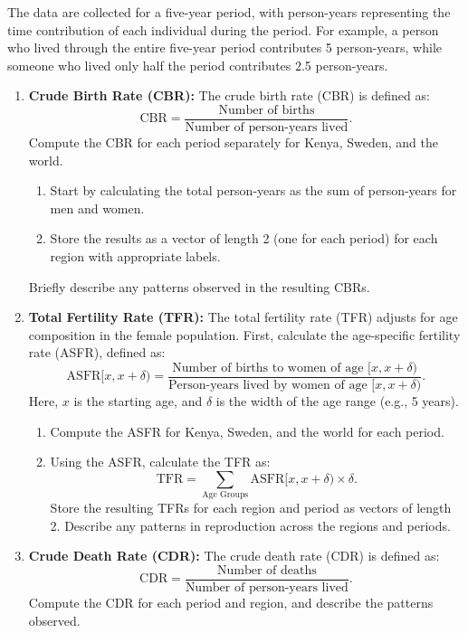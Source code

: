 \documentclass[12pt]{article}
\begin{document}
The data are collected for a five-year period, with person-years representing the time contribution of each individual during the period. For example, a person who lived through the entire five-year period contributes 5 person-years, while someone who lived only half the period contributes 2.5 person-years.

\begin{enumerate}
    \item \textbf{Crude Birth Rate (CBR):} The crude birth rate (CBR) is defined as:
    \[
    \text{CBR} = \frac{\text{Number of births}}{\text{Number of person-years lived}}.
    \]
    Compute the CBR for each period separately for Kenya, Sweden, and the world. 
    \begin{enumerate}
        \item Start by calculating the total person-years as the sum of person-years for men and women.
        \item Store the results as a vector of length 2 (one for each period) for each region with appropriate labels.
    \end{enumerate}
    Briefly describe any patterns observed in the resulting CBRs.

    \item \textbf{Total Fertility Rate (TFR):} The total fertility rate (TFR) adjusts for age composition in the female population. First, calculate the age-specific fertility rate (ASFR), defined as:
    \[
    \text{ASFR}[x, x+\delta) = \frac{\text{Number of births to women of age } [x, x+\delta)}{\text{Person-years lived by women of age } [x, x+\delta)}.
    \]
    Here, $x$ is the starting age, and $\delta$ is the width of the age range (e.g., 5 years). 
    \begin{enumerate}
        \item Compute the ASFR for Kenya, Sweden, and the world for each period.
        \item Using the ASFR, calculate the TFR as:
        \[
        \text{TFR} = \sum_{\text{Age Groups}} \text{ASFR}[x, x+\delta) \times \delta.
        \]
        Store the resulting TFRs for each region and period as vectors of length 2. Describe any patterns in reproduction across the regions and periods.
    \end{enumerate}

    \item \textbf{Crude Death Rate (CDR):} The crude death rate (CDR) is defined as:
    \[
    \text{CDR} = \frac{\text{Number of deaths}}{\text{Number of person-years lived}}.
    \]
    Compute the CDR for each period and region, and describe the patterns observed.


\end{enumerate}
\end{document}
